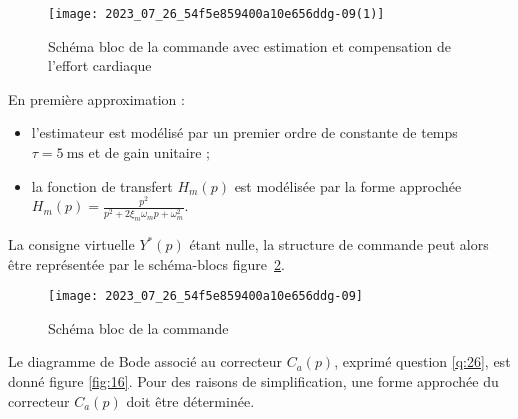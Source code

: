 \begin{figure}[!h]
\centering
\texttt{[image: 2023\_07\_26\_54f5e859400a10e656ddg-09(1)]}
\caption{\label{fig:14}Schéma bloc de la commande avec estimation et compensation de l'effort cardiaque}
\end{figure}

En première approximation :
\begin{itemize}
\item l'estimateur est modélisé par un premier ordre de constante de temps $\tau=5 \mathrm{~ms}$ et de gain unitaire ;
  \item la fonction de transfert $H_{m}(p)$ est modélisée par la forme approchée $H_{m}(p)=\frac{p^{2}}{p^{2}+2 \xi_{m} \omega_{m} p+\omega_{m}^{2}}$.
\end{itemize}

La consigne virtuelle $Y^{*}(p)$ étant nulle, la structure de commande peut alors être représentée par le schéma-blocs figure~\ref{fig:15}.

\begin{figure}[!h]
\centering
\texttt{[image: 2023\_07\_26\_54f5e859400a10e656ddg-09]}
\caption{\label{fig:15}Schéma bloc de la commande}
\end{figure}




Le diagramme de Bode associé au correcteur $C_{a}(p)$, exprimé question \ref{q:26}, est donné figure \ref{fig:16}. Pour des raisons de simplification, une forme approchée du correcteur $C_{a}(p)$ doit être déterminée.


